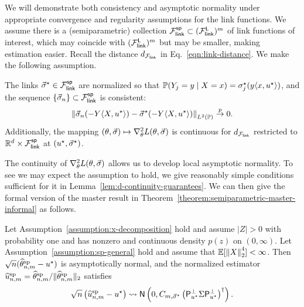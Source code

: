 We will demonstrate both consistency and
asymptotic normality under appropriate convergence and regularity
assumptions for the link functions. We assume there is a (semiparametric)
collection $\mathcal{F}_{\mathsf{link}}^{\mathsf{sp}} \subset (\mathcal{F}_{\mathsf{link}}^{\mathsf{L}})^m$ of link functions of
interest, which may coincide with $(\mathcal{F}_{\mathsf{link}}^{\mathsf{L}})^m$ but may be smaller,
making estimation easier. Recall the distance $d_{\mathcal{F}_{\mathsf{link}}}$ in Eq.~\eqref{eqn:link-distance}.
We make the following assumption.
\begin{assumption}
  \label{assumption:sp-general}
  The links $\vec{\sigma}^\star \in \mathcal{F}_{\mathsf{link}}^{\mathsf{sp}}$ are normalized so
  that $\mathbb{P}(Y_j = y \mid X = x) = \sigma^\star_j(y \langle x, u^\star\rangle)$, and
  the sequence $\{\vec{\sigma}_n\} \subset \mathcal{F}_{\mathsf{link}}^{\mathsf{sp}}$ is consistent:
  \begin{equation*}
    \left\|{\vec{\sigma}_n(-Y\langle X, u^\star\rangle)
      - \vec{\sigma}^\star(-Y\langle X, u^\star\rangle)}\right\|_{L^2(\mathbb{P})}
    \stackrel{p}{\rightarrow} 0.
  \end{equation*}
  Additionally, the mapping $(\theta, \vec{\sigma}) \mapsto \nabla_\theta^2
  L(\theta, \vec{\sigma})$ is continuous for $d_{\mathcal{F}_{\mathsf{link}}}$ restricted
  to $\mathbb{R}^d \times \mathcal{F}_{\mathsf{link}}^{\mathsf{sp}}$ at $(u^\star, \vec{\sigma}^\star)$.
\end{assumption}
The continuity of $\nabla_\theta^2 L(\theta, \vec{\sigma})$ 
allows us to develop local asymptotic normality.
To see we may expect the assumption to hold, we give reasonably simple
conditions sufficient for it in Lemma~\ref{lem:d-continuity-guarantees}. We can then give the formal version of the master result in Theorem~\ref{theorem:semiparametric-master-informal} as follows.
\begin{theorem}
	\label{theorem:semiparametric-master}
	Let Assumption~\ref{assumption:x-decomposition} hold and assume $|Z| >
	0$ with probability one and has nonzero and continuous density $p(z)$ on
	$(0, \infty)$.  Let Assumption~\ref{assumption:sp-general} hold and assume
	that $\mathbb{E} [\left\|{X}\right\|_2^4] < \infty$.  Then $\sqrt{n}(\widehat{\theta}^{\textup{sp}}_{n,m} - u^\star)$ is
	asymptotically normal, and the normalized estimator $\widehat{u}^{\textup{sp}}_{n,m} =
	\widehat{\theta}^{\textup{sp}}_{n,m} / \|{\widehat{\theta}^{\textup{sp}}_{n,m}}\|_2$ satisfies
	\begin{equation*}
		\sqrt{n} \left({\widehat{u}^{\textup{sp}}_{n,m} - u^\star}\right)
		\rightsquigarrow \mathsf{N}\left({0, 	C_{m, \vec{\sigma}^\star}
			\left({\mathsf{P}_{u^\star}^\perp \Sigma \mathsf{P}_{u^\star}^\perp}\right)^\dagger}\right).
	\end{equation*}
\end{theorem}


